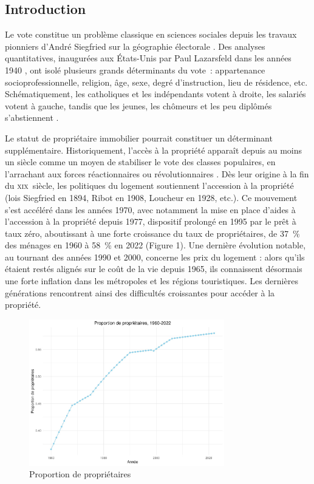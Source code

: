\documentclass[a4paper,14pt]{article}
\begin{document}
\begin{multicols}{2}

\section*{Introduction}
Le vote constitue un problème classique en sciences sociales depuis les travaux pionniers d'André Siegfried sur la géographie électorale \parencite{siegfried_tableau_1980}. Des analyses quantitatives, inaugurées aux États-Unis par Paul Lazarsfeld dans les années 1940 \parencite{lazarsfeld_peoples_2021}, ont isolé plusieurs grands déterminants du vote~: appartenance socioprofessionnelle, religion, âge, sexe, degré d'instruction, lieu de résidence, etc. Schématiquement, les catholiques et les indépendants votent à droite, les salariés votent à gauche, tandis que les jeunes, les chômeurs et les peu diplômés s'abstiennent \parencite{douillet_sociologie_2023}.


Le statut de propriétaire immobilier pourrait constituer un déterminant supplémentaire. Historiquement, l'accès à la propriété apparaît depuis au moins un siècle comme un moyen de stabiliser le vote des classes populaires, en l'arrachant aux forces réactionnaires ou révolutionnaires \parencite{michel_cause_2006}. Dès leur origine à la fin du \textsc{xix}\ieme ~siècle, les politiques du logement soutiennent l'accession à la propriété (lois Siegfried en 1894, Ribot en 1908, Loucheur en 1928, etc.). Ce mouvement s'est accéléré dans les années 1970, avec notamment la mise en place d'aides à l'accession à la propriété depuis 1977, dispositif prolongé en 1995 par le prêt à taux zéro, aboutissant à une forte croissance du taux de propriétaires, de 37~\% des ménages en 1960 à 58~\% en 2022 (Figure 1). Une dernière évolution notable, au tournant des années 1990 et 2000, concerne les prix du logement : alors qu'ils étaient restés alignés sur le coût de la vie depuis 1965, ils connaissent désormais une forte inflation dans les métropoles et les régions touristiques. Les dernières générations rencontrent ainsi des difficultés croissantes pour accéder à la propriété.

    \begin{figure}[H]
    \centering
         \includegraphics[width=8.5cm]{hist_tx_proprio.jpg}
         \caption{Proportion de propriétaires} 
    \end{figure}


\end{multicols}
\end{document}
